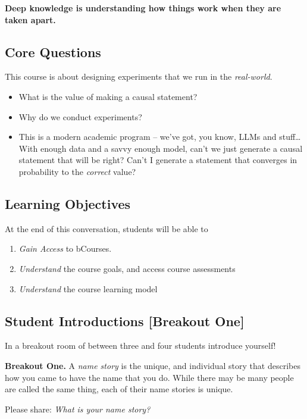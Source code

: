 \documentclass[
]{article}
\providecommand{\tightlist}{%
  \setlength{\itemsep}{0pt}\setlength{\parskip}{0pt}}
\theoremstyle{definition}
\theoremstyle{definition}
\theoremstyle{definition}
\theoremstyle{definition}
\theoremstyle{remark}
\begin{document}
\textbf{Deep knowledge is understanding how things work when they are taken apart.}

\subsection{Core Questions}\label{core-questions}

This course is about designing experiments that we run in the \emph{real-world}.

\begin{itemize}
\tightlist
\item
  What is the value of making a causal statement?
\item
  Why do we conduct experiments?
\item
  This is a modern academic program -- we've got, you know, LLMs and stuff\ldots{} With enough data and a savvy enough model, can't we just generate a causal statement that will be right? Can't I generate a statement that converges in probability to the \emph{correct} value?
\end{itemize}

\subsection{Learning Objectives}\label{learning-objectives}

At the end of this conversation, students will be able to

\begin{enumerate}
\def\labelenumi{\arabic{enumi}.}
\tightlist
\item
  \emph{Gain Access} to bCourses.
\item
  \emph{Understand} the course goals, and access course assessments
\item
  \emph{Understand} the course learning model
\end{enumerate}

\subsection{Student Introductions {[}Breakout One{]}}\label{student-introductions-breakout-one}

In a breakout room of between three and four students introduce yourself!

\begin{breakout}
\textbf{Breakout One.} A \emph{name story} is the unique, and individual story that describes how you came to have the name that you do. While there may be many people are called the same thing, each of their name stories is unique.

Please share: \emph{What is your name story?}

\end{breakout}
\end{document}
